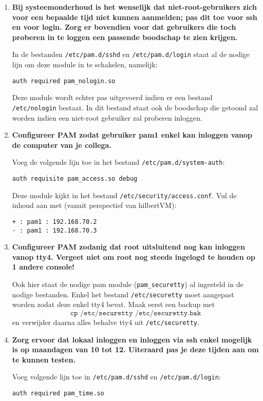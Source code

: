\documentclass{report}
\begin{document}
\begin{enumerate}
	\item \textbf{Bij systeemonderhoud is het wenselijk dat niet-root-gebruikers zich voor een bepaalde tijd niet kunnen aanmelden; pas dit toe voor ssh en voor login. Zorg er bovendien voor dat gebruikers die toch proberen in te loggen een passende boodschap te zien krijgen.}
	
	In de bestanden \texttt{/etc/pam.d/sshd} en \texttt{/etc/pam.d/login} staat al de nodige lijn om deze module in te schakelen, namelijk:
	\begin{lstlisting}
auth required pam_nologin.so
	\end{lstlisting}
	Deze module wordt echter pas uitgevoerd indien er een bestand \texttt{/etc/nologin} bestaat. In dit bestand staat ook de boodschap die getoond zal worden indien een niet-root gebruiker zal proberen inloggen.

	\item \textbf{Configureer PAM zodat gebruiker pam1 enkel kan inloggen vanop de computer van je collega.}
	
	Voeg de volgende lijn toe in het bestand \texttt{/etc/pam.d/system-auth}:
	\begin{lstlisting}
auth requisite pam_access.so debug
	\end{lstlisting}
	Deze module kijkt in het bestand \texttt{/etc/security/access.conf}. Vul de inhoud aan met (vanuit perspectief van hilbertVM):
	\begin{lstlisting}
+ : pam1 : 192.168.70.2
- : pam1 : 192.168.70.3
	\end{lstlisting}
	\item \textbf{Configureer PAM zodanig dat root uitsluitend nog kan inloggen vanop tty4. Vergeet niet om root nog steeds ingelogd te houden op 1 andere console!}
	
	Ook hier staat de nodige pam module (\texttt{pam\_securetty}) al ingesteld in de nodige bestanden. Enkel het bestand \texttt{/etc/securetty} moet aangepast worden zodat deze enkel tty4 bevat. Maak eerst een backup met 
	$$\texttt{cp /etc/securetty /etc/securetty.bak}$$
	en verwijder daarna alles behalve tty4 uit \texttt{/etc/securetty}.

	\item \textbf{Zorg ervoor dat lokaal inloggen en inloggen via ssh enkel mogelijk is op maandagen van 10 tot 12. Uiteraard pas je deze tijden aan om te kunnen testen.}
	
	Voeg volgende lijn toe in \texttt{/etc/pam.d/sshd} en \texttt{/etc/pam.d/login}:
	\begin{lstlisting}
auth required pam_time.so
	\end{lstlisting}


\end{enumerate}
\end{document}
